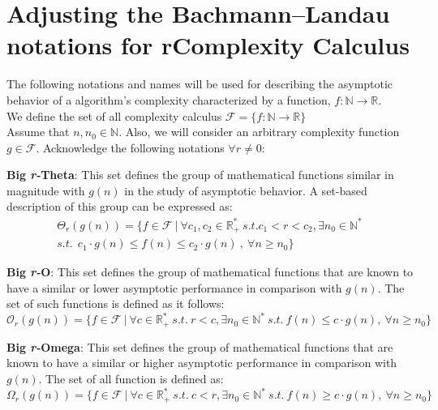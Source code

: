\section{Adjusting the Bachmann–Landau notations for rComplexity Calculus}
The following notations and names will be used for describing the asymptotic behavior of a algorithm's complexity characterized by a function, $f:\mathbb{N}\longrightarrow\mathbb{R}$. \\
We define the set of all complexity calculus $\mathcal{F}= \lbrace f:\mathbb{N}\longrightarrow\mathbb{R} \rbrace$
\\Assume that $n, n_{0}\in\mathbb{N}$. Also, we will consider an arbitrary complexity function $g \in \mathcal{F}$.
Acknowledge the following notations $\forall r \neq 0$:

\begin{definition}
    \textbf{Big \textit{r-}Theta}: This set defines the group of mathematical functions similar in magnitude with  $g(n)$ in the study of asymptotic behavior. A set-based description of this group can be expressed as:
    \[\begin{split}
          \Theta_{r}(g(n)) = \lbrace f \in \mathcal{F}\ |\ \forall c_{1}, c_{2} \in \mathbb{R}^{*}_{+} \ s.t. c_{1}< r < c_{2} , \exists n_{0} \in \mathbb{N}^{*}\ \\ s.t.\ \ c_{1} \cdot g(n) \leq f(n) \leq c_{2} \cdot g(n)\ ,\  \forall n \geq n_{0} \rbrace
    \end{split} \]
\end{definition}

\begin{definition}
    \textbf{Big \textit{r-}O}: This set defines the group of mathematical functions that are known to have a similar or lower
    asymptotic performance in comparison with  $g(n)$. The set of such functions is defined as it follows:
    \[\mathcal{O}_{r}(g(n)) = \lbrace f \in \mathcal{F}\ |\ \forall c  \in \mathbb{R}^{*}_{+} \ s.t.\  r<c, \exists n_{0} \in \mathbb{N}^{*}\ s.t.\  f(n) \leq c \cdot g(n),\  \forall n \geq n_{0} \rbrace\]
\end{definition}

\begin{definition}
    \textbf{Big \textit{r-}Omega}: This set defines the group of mathematical functions that are known to have a similar or higher asymptotic performance in comparison with  $g(n)$. The set of all function is defined as:
    \[\Omega_{r}(g(n)) = \lbrace f \in \mathcal{F}\ |\ \forall c  \in \mathbb{R}^{*}_{+}\ s.t. \ c < r, \exists n_{0} \in \mathbb{N}^{*}\ s.t.\  f(n) \geq c \cdot g(n),\  \forall n \geq n_{0} \rbrace\]
\end{definition}

